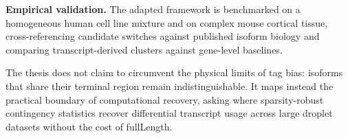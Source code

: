 \textbf{Empirical validation.} The adapted framework is benchmarked on a homogeneous human cell line mixture and on complex mouse cortical tissue, cross-referencing candidate switches against published isoform biology and comparing transcript-derived clusters against gene-level baselines.

The thesis does not claim to circumvent the physical limits of tag bias: isoforms that share their terminal region remain indistinguishable. It maps instead the practical boundary of computational recovery, asking where sparsity-robust contingency statistics recover differential transcript usage across large droplet datasets without the cost of \gls{fullLength}.

